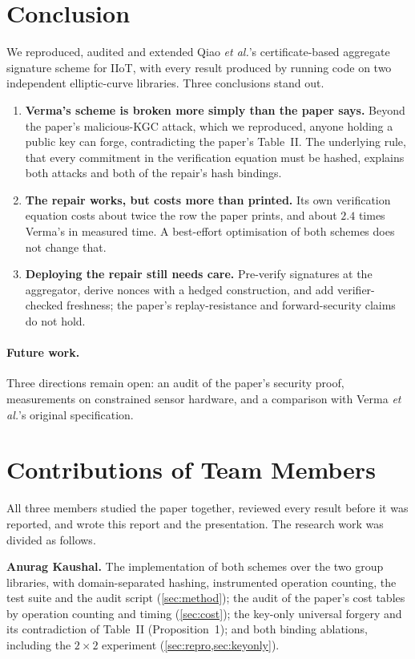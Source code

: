 \section{Conclusion}\label{sec:conclusion}

We reproduced, audited and extended Qiao \emph{et al.}'s certificate-based aggregate signature scheme for
IIoT, with every result produced by running code on two independent elliptic-curve libraries. Three
conclusions stand out.

\begin{enumerate}
\item \textbf{Verma's scheme is broken more simply than the paper says.} Beyond the paper's
      malicious-KGC attack, which we reproduced, anyone holding a public key can forge, contradicting the
      paper's Table~II. The underlying rule, that every commitment in the verification equation must be
      hashed, explains both attacks and both of the repair's hash bindings.
\item \textbf{The repair works, but costs more than printed.} Its own verification equation costs about
      twice the row the paper prints, and about $2.4$ times Verma's in measured time. A best-effort
      optimisation of both schemes does not change that.
\item \textbf{Deploying the repair still needs care.} Pre-verify signatures at the aggregator, derive
      nonces with a hedged construction, and add verifier-checked freshness; the paper's replay-resistance
      and forward-security claims do not hold.
\end{enumerate}

\paragraph{Future work.} Three directions remain open: an audit of the paper's security proof,
measurements on constrained sensor hardware, and a comparison with Verma \emph{et al.}'s original
specification.

\section*{Contributions of Team Members}
All three members studied the paper together, reviewed every result before it was reported, and wrote
this report and the presentation. The research work was divided as follows.

\smallskip\noindent\textbf{Anurag Kaushal.} The implementation of both schemes over the two group
libraries, with domain-separated hashing, instrumented operation counting, the test suite and the audit
script (\cref{sec:method}); the audit of the paper's cost tables by operation counting and timing
(\cref{sec:cost}); the key-only universal forgery and its contradiction of Table~II (Proposition~1); and
both binding ablations, including the $2\times2$ experiment (\cref{sec:repro,sec:keyonly}).

